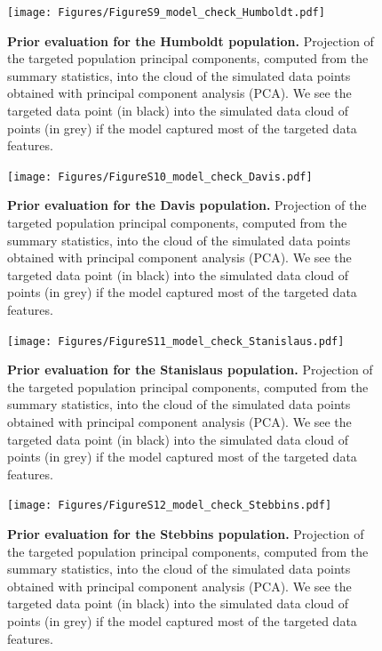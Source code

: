 \documentclass[a4paper, 12pt]{article}
\begin{document}
\begin{figure}[ht]
  \centering
  \texttt{[image: Figures/FigureS9\_model\_check\_Humboldt.pdf]}
  \small\caption{\textbf{Prior evaluation for the Humboldt population.} Projection of the targeted population principal components, computed from the summary statistics, into the cloud of the simulated data points obtained with principal component analysis (PCA). We see the targeted data point (in black) into the simulated data cloud of points (in grey) if the model captured most of the targeted data features.}
  \label{fig:supple_model_check_humboldt}
\end{figure}

\begin{figure}[ht]
  \centering
  \texttt{[image: Figures/FigureS10\_model\_check\_Davis.pdf]}
  \small\caption{\textbf{Prior evaluation for the Davis population.} Projection of the targeted population principal components, computed from the summary statistics, into the cloud of the simulated data points obtained with principal component analysis (PCA). We see the targeted data point (in black) into the simulated data cloud of points (in grey) if the model captured most of the targeted data features.}
  \label{fig:supple_model_check_davis}
\end{figure}

\begin{figure}[ht]
  \centering
  \texttt{[image: Figures/FigureS11\_model\_check\_Stanislaus.pdf]}
  \small\caption{\textbf{Prior evaluation for the Stanislaus population.} Projection of the targeted population principal components, computed from the summary statistics, into the cloud of the simulated data points obtained with principal component analysis (PCA). We see the targeted data point (in black) into the simulated data cloud of points (in grey) if the model captured most of the targeted data features.}
  \label{fig:supple_model_check_stanislaus}
\end{figure}

\begin{figure}[ht]
  \centering
  \texttt{[image: Figures/FigureS12\_model\_check\_Stebbins.pdf]}
  \small\caption{\textbf{Prior evaluation for the Stebbins population.} Projection of the targeted population principal components, computed from the summary statistics, into the cloud of the simulated data points obtained with principal component analysis (PCA). We see the targeted data point (in black) into the simulated data cloud of points (in grey) if the model captured most of the targeted data features.}
  \label{fig:supple_model_check_stebbins}
\end{figure}
\end{document}

